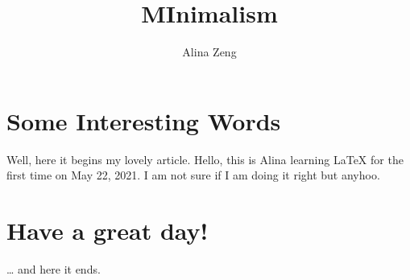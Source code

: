 \documentclass[a4paper, 12pt]{article}
\author{Alina Zeng}
\title{MInimalism}
\begin{document}
\maketitle
\tableofcontents
\section{Some Interesting Words}
Well, here it begins my lovely article.
Hello, this is Alina learning LaTeX for the first time on May 22, 2021. I am not sure if I am doing it right but anyhoo. 
\section{Have a great day!}
\ldots{} and here it ends.
\end{document}
